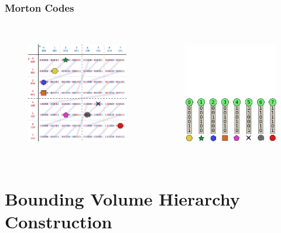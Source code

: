 \documentclass{beamer}
\begin{document}
\begin{frame}
  \frametitle{Morton Codes}
  
\begin{columns}[t]

\begin{figure}
\includegraphics[height=55mm]{Z-curve-primitives.png}
\end{figure}

\begin{figure}
\includegraphics[height=55mm]{keys_7.png}
\end{figure}
\end{columns}
\end{frame}

\section{Bounding Volume Hierarchy Construction}
\end{document}
